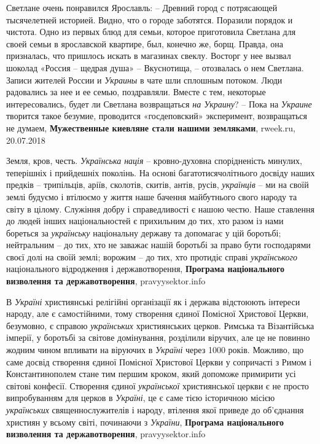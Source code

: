 Светлане очень понравился Ярославль: – Древний город с потрясающей тысячелетней
историей. Видно, что о городе заботятся. Поразили порядок и чистота.  Одно из
первых блюд для семьи, которое приготовила Светлана для своей семьи в
ярославской квартире, был, конечно же, борщ. Правда, она призналась, что
пришлось искать в магазинах свеклу. Восторг у нее вызвал шоколад «Россия –
щедрая душа» – Вкуснотища, – отозвалась о нем Светлана. Записи жителей России
и \emph{Украины} в чате шли сплошным потоком. Люди радовались за нее и ее семью,
поздравляли. Вместе с тем, некоторые интересовались, будет ли Светлана
возвращаться \emph{на Украину}?  – Пока на \emph{Украине} творится такое безумие, проводится
«госдеповский» эксперимент, возвращаться не думаем,
\textbf{Мужественные киевляне стали нашими земляками}, rweek.ru, 20.07.2018

Земля, кров, честь. \emph{Українська нація} – кровно-духовна спорідненість минулих,
теперішніх і прийдешніх поколінь. На основі багатотисячолітнього досвіду наших
предків – трипільців, аріїв, сколотів, скитів, антів, русів, \emph{українців} – ми на
своїй землі будуємо і втілюємо у життя наше бачення майбутнього свого народу та
світу в цілому. Служіння добру і справедливості є нашою честю.  Наше ставлення
до людей інших національностей є прихильним до тих, хто разом із нами бореться
за \emph{українську} національну державу та допомагає у цій боротьбі; нейтральним – до
тих, хто не заважає нашій боротьбі за право бути господарями своєї долі на
своїй землі; ворожим – до тих, хто протидіє справі \emph{українського} національного
відродження і державотворення,
\textbf{Програма національного визволення та державотворення}, pravyysektor.info

В \emph{Україні} християнські релігійні організації як і держава відстоюють інтереси
народу, але є самостійними, тому створення єдиної Помісної Христової Церкви,
безумовно, є справою \emph{українських} християнських церков. Римська та Візантійська
імперії, у боротьбі за світове домінування, розділили віручих, але це не
повинно жодним чином впливати на віруючих в \emph{Україні} через 1000 років. Можливо,
що саме досвід створення єдиної Помісної Христової Церкви у сопричасті з Римом
і Константинополем стане тим першим кроком, який допоможе примирити усі світові
конфесії. Створення єдиної \emph{української} християнської церкви є не просто
випробуванням для церков в \emph{Україні}, це є саме тією історичною місією
\emph{українських} священнослужителів і народу, втілення якої приведе до об'єднання
християн у всьому світі, починаючи з \emph{України},
\textbf{Програма національного визволення та державотворення}, pravyysektor.info


